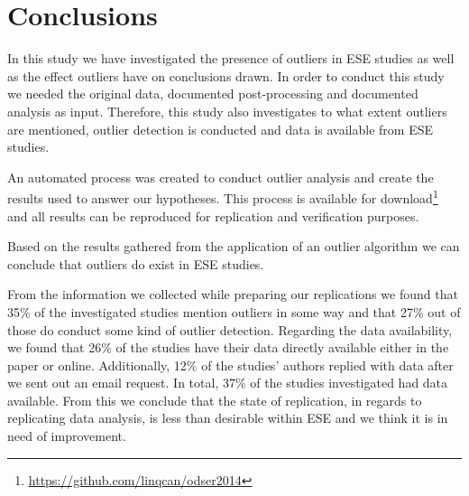 ﻿\section{Conclusions}
\label{sec:conclusions}
In this study we have investigated the presence of outliers in ESE studies as well as the effect outliers have on conclusions drawn. In order to conduct this study we needed the original data, documented post-processing and documented analysis as input. Therefore, this study also investigates to what extent outliers are mentioned, outlier detection is conducted and data is available from ESE studies.




An automated process was created to conduct outlier analysis and create the results used to answer our hypotheses. This process is available for download\footnote{\url{https://github.com/linqcan/odser2014}} and all results can be reproduced for replication and verification purposes.




Based on the results gathered from the application of an outlier algorithm we can conclude that outliers do exist in ESE studies.




From the information we collected while preparing our replications we found that 35\% of the investigated studies mention outliers in some way and that 27\% out of those do conduct some kind of outlier detection. Regarding the data availability, we found that 26\% of the studies have their data directly available either in the paper or online. Additionally, 12\% of the studies' authors replied with data after we sent out an email request. In total, 37\% of the studies investigated had data available. From this we conclude that the state of replication, in regards to replicating data analysis, is less than desirable within ESE and we think it is in need of improvement.




